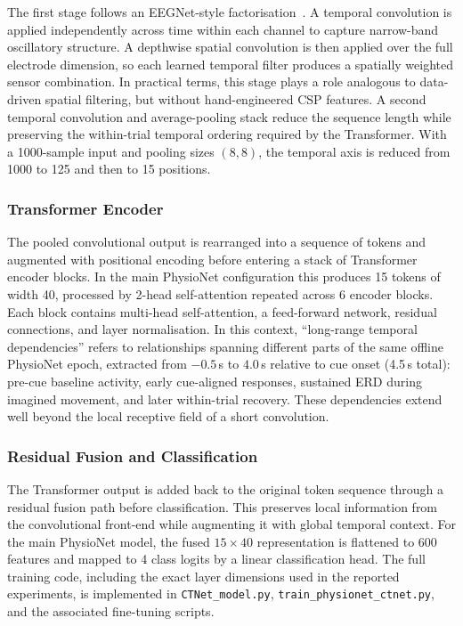 \documentclass[12pt, a4paper]{article}
\begin{document}
The first stage follows an EEGNet-style factorisation~\cite{lawhern2018eegnet}. A temporal convolution is applied independently across time within each channel to capture narrow-band oscillatory structure. A depthwise spatial convolution is then applied over the full electrode dimension, so each learned temporal filter produces a spatially weighted sensor combination. In practical terms, this stage plays a role analogous to data-driven spatial filtering, but without hand-engineered CSP features. A second temporal convolution and average-pooling stack reduce the sequence length while preserving the within-trial temporal ordering required by the Transformer. With a 1000-sample input and pooling sizes $(8, 8)$, the temporal axis is reduced from 1000 to 125 and then to 15 positions.

\subsubsection{Transformer Encoder}

The pooled convolutional output is rearranged into a sequence of tokens and augmented with positional encoding before entering a stack of Transformer encoder blocks. In the main PhysioNet configuration this produces 15 tokens of width 40, processed by 2-head self-attention repeated across 6 encoder blocks. Each block contains multi-head self-attention, a feed-forward network, residual connections, and layer normalisation. In this context, ``long-range temporal dependencies'' refers to relationships spanning different parts of the same offline PhysioNet epoch, extracted from $-0.5$\,s to $4.0$\,s relative to cue onset (4.5\,s total): pre-cue baseline activity, early cue-aligned responses, sustained ERD during imagined movement, and later within-trial recovery. These dependencies extend well beyond the local receptive field of a short convolution.

\subsubsection{Residual Fusion and Classification}

The Transformer output is added back to the original token sequence through a residual fusion path before classification. This preserves local information from the convolutional front-end while augmenting it with global temporal context. For the main PhysioNet model, the fused $15 \times 40$ representation is flattened to 600 features and mapped to 4 class logits by a linear classification head. The full training code, including the exact layer dimensions used in the reported experiments, is implemented in \texttt{CTNet\_model.py}, \texttt{train\_physionet\_ctnet.py}, and the associated fine-tuning scripts.
\end{document}
